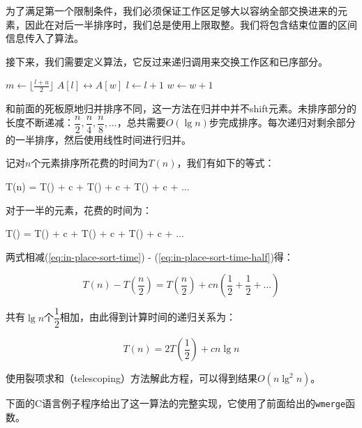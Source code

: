 \documentclass[b5paper]{ctexart}
\begin{document}
为了满足第一个限制条件，我们必须保证工作区足够大以容纳全部交换进来的元素，因此在对后一半排序时，我们总是使用上限取整。我们将包含结束位置的区间信息传入了算法。

接下来，我们需要定义算法，它反过来递归调用来交换工作区和已序部分。

\begin{algorithmic}[1]
    \State $m \gets \lfloor \frac{l + u}{2} \rfloor$
    \State {}
    \State {}
    \State {}
  \Else {}
      \State {} $A[l] \leftrightarrow A[w]$
      \State $l \gets l + 1$
      \State $w \gets w + 1$
    \EndWhile
  \EndIf
\EndProcedure
\end{algorithmic}

和前面的死板原地归并排序不同，这一方法在归并中并不shift元素。未排序部分的长度不断递减：$\dfrac{n}{2}, \dfrac{n}{4}, \dfrac{n}{8}, ...$，总共需要$O(\lg n)$步完成排序。每次递归对剩余部分的一半排序，然后使用线性时间进行归并。

记对$n$个元素排序所花费的时间为$T(n)$，我们有如下的等式：

\be
T(n) = T() + c  + T() + c  + T() + c  + ...
\label{eq:in-place-sort-time}
\ee

对于一半的元素，花费的时间为：

\be
T() = T() + c  + T() + c  + T() + c  + ...
\label{eq:in-place-sort-time-half}
\ee

两式相减(\ref{eq:in-place-sort-time}) - (\ref{eq:in-place-sort-time-half})得：

\[
T(n) - T(\frac{n}{2}) = T(\frac{n}{2}) + c n (\frac{1}{2} + \frac{1}{2} + ... )
\]

共有$\lg n$个$\dfrac{1}{2}$相加，由此得到计算时间的递归关系为：

\[
T(n) = 2 T(\frac{1}{2}) + c n \lg n
\]

使用裂项求和（telescoping）方法解此方程，可以得到结果$O(n \lg^2 n)$。

下面的C语言例子程序给出了这一算法的完整实现，它使用了前面给出的\texttt{wmerge}函数。
\end{document}
